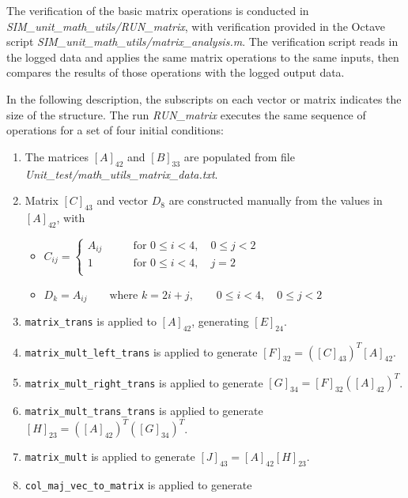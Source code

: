 \documentclass[11pt,fleqn]{report}
\begin{document}
The verification of the basic matrix operations is conducted in
\textit{SIM\_unit\_math\_utils/RUN\_matrix},
with verification provided in the Octave script
\textit{SIM\_unit\_math\_utils/matrix\_analysis.m}. The verification script
reads in the logged data and applies the same matrix operations to the same
inputs,
then compares the results of those operations with the logged output data.

In the following description, the subscripts on each vector or matrix indicates the
size of the structure. The run \textit{RUN\_matrix} executes the same sequence
of operations for a set of four initial conditions:
\begin{enumerate}
    \item The matrices $[A]_{42}$ and $[B]_{33}$ are populated from file
        \textit{Unit\_test/math\_utils\_matrix\_data.txt}.
    \item{Matrix $[C]_{43}$ and vector $D_8$ are constructed manually from the values in
        $[A]_{42}$, with
            \begin{itemize}
                \item $C_{ij} =
                        \begin{cases}
                            A_{ij} & \qquad \text{for } 0 \leqslant i < 4, \quad 0 \leqslant j < 2 \\
                            1 & \qquad \text{for } 0 \leqslant i < 4, \quad j = 2 \\
                        \end{cases}$
                \item $D_{k} = A_{ij} \qquad \text{where } k=2i+j, \qquad 0 \leqslant i < 4, \quad 0 \leqslant j < 2$
            \end{itemize}}
    \item \texttt{matrix\_trans} is applied to $[A]_{42}$, generating
        $[E]_{24}$.
    \item \texttt{matrix\_mult\_left\_trans} is applied to generate
        $[F]_{32} = ([C]_{43})^T [A]_{42}$.
    \item \texttt{matrix\_mult\_right\_trans} is applied to generate
        $[G]_{34} = [F]_{32} ([A]_{42})^T$.
    \item \texttt{matrix\_mult\_trans\_trans} is applied to generate
        $[H]_{23} = ([A]_{42})^T ([G]_{34})^T$.
    \item \texttt{matrix\_mult} is applied to generate
        $[J]_{43} = [A]_{42} [H]_{23}$.
    \item \texttt{col\_maj\_vec\_to\_matrix} is applied to generate

\end{enumerate}
\end{document}
